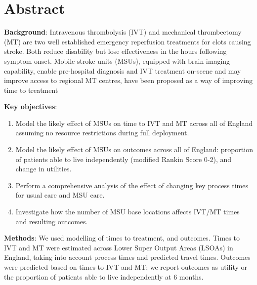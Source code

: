\section*{Abstract}

\textbf{Background}: Intravenous thrombolysis (IVT) and mechanical thrombectomy (MT) are two well established emergency reperfusion treatments for clots causing stroke. Both reduce disability but lose effectiveness in the hours following symptom onset. Mobile stroke units (MSUs), equipped with brain imaging capability, enable pre-hospital diagnosis and IVT treatment on-scene and may improve access to regional MT centres, have been proposed as a way of improving time to treatment

\textbf{Key objectives}:

\begin{enumerate}
    \item Model the likely effect of MSUs on time to IVT and MT across all of England assuming no resource restrictions during full deployment.
    \item Model the likely effect of MSUs on outcomes across all of England: proportion of patients able to live independently (modified Rankin Score 0-2), and change in utilities.
    \item Perform a comprehensive analysis of the effect of changing key process times for usual care and MSU care.
    \item Investigate how the number of MSU base locations affects IVT/MT times and resulting outcomes.
\end{enumerate}

\textbf{Methods}: We used modelling of times to treatment, and outcomes. Times to IVT and MT were estimated across Lower Super Output Areas (LSOAs) in England, taking into account process times and predicted travel times. Outcomes were predicted based on times to IVT and MT; we report outcomes as utility or the proportion of patients able to live independently at 6 months.

